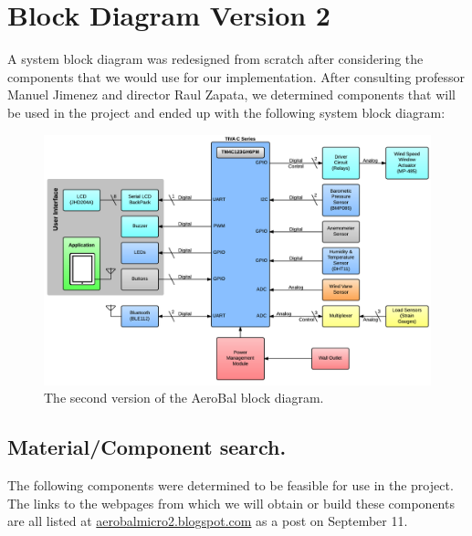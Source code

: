\section{Block Diagram Version 2}
		A system block diagram was redesigned from scratch after considering the components that we would use for our implementation. After consulting professor Manuel Jimenez and director Raul Zapata, we determined components that will be used in the project and ended up with the following system block diagram:

		
		\begin{figure}[H]
			\centering
				\includegraphics[scale=0.30]{img/blockdiagramv2}
			\caption{The second version of the AeroBal block diagram.}
		\end{figure}

		\subsection{Material/Component search.}

			The following components were determined to be feasible for use in the project. The links to the webpages from which we will obtain or build these components are all listed at \url{aerobalmicro2.blogspot.com} as a post on September 11.

